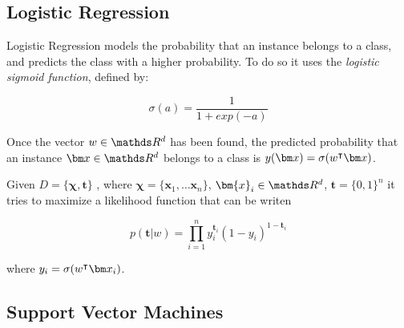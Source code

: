   \subsection{Logistic Regression}
  \label{ssec:log-reg}
  \begin{pre-delivery}
    Logistic Regression\cite{cox1958regression} models the probability that an instance belongs to
    a class, and predicts the class with a higher probability. To do so it
    uses the \textit{logistic sigmoid function}\cite{han1995influence}, defined by:

    \begin{equation}
      \sigma(a) = \frac{1}{1 + exp(-a)}
    \end{equation}

     Once the vector $w \in \reals^d$ has been found, the predicted probability
     that an instance $\vx \in \reals^d$ belongs to a class is
     $y(\vx) = \sigma(w^\transp\vx)$.


     Given
     $D = \{\bm{\chi}, \bm{t}\}$
     , where
     $\bm{\chi} = \{\bm{x}_1, \ldots \bm{x}_n\}$, $\bm{x}_i \in \reals^d$, $\bm{t} = \{0, 1\}^n$
     it tries to maximize a likelihood function that can be writen

     \begin{equation}
       p(\bm{t} | w) = \prod_{i = 1}^n y_i^{\bm{t}_i} (1 - y_i)^{1 - \bm{t}_i}
     \end{equation}

     where $y_i = \sigma(w^\transp\vx_i)$.

  \end{pre-delivery}
  \subsection{Support Vector Machines}
  \label{ssec:svm}

